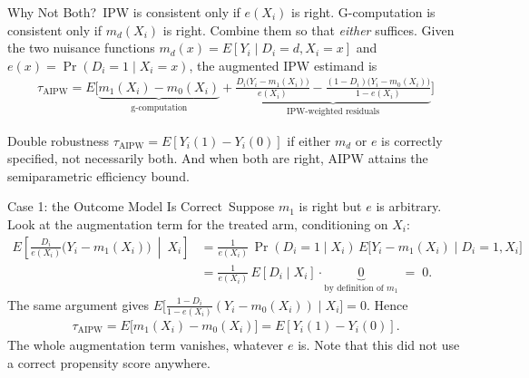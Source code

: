 \documentclass[aspectratio=169,11pt,xcolor=dvipsnames]{beamer}
\newcommand{\E}{E}
\newcommand{\adv}{\,\raisebox{0.6pt}{\textcolor{accent}{$\bigstar$}}}
\newcommand{\core}{\,\raisebox{0.6pt}{\textcolor{corestar}{$\bigstar$}}}
\begin{document}
\begin{frame}{Why Not Both?\core}
IPW is consistent only if $e(X_i)$ is right. G-computation is consistent only if
$m_d(X_i)$ is right. Combine them so that \emph{either} suffices.
\vskip3pt
Given the two nuisance functions
$m_d(x) = \E[Y_i\mid D_i=d,X_i=x]$ and $e(x) = \Pr(D_i=1\mid X_i=x)$, the
\alert{augmented IPW} estimand is
\begin{align*}
  \tau_{\text{AIPW}} = \E\Bigg[
  \underbrace{m_1(X_i) - m_0(X_i)}_{\text{g-computation}}
  + \underbrace{\frac{D_i\big(Y_i - m_1(X_i)\big)}{e(X_i)}
  - \frac{(1-D_i)\big(Y_i-m_0(X_i)\big)}{1-e(X_i)}}_{\text{IPW-weighted residuals}}
  \Bigg]
\end{align*}
\vskip3pt
\begin{block}{Double robustness}
$\tau_{\text{AIPW}} = \E[Y_i(1)-Y_i(0)]$ if \alert{either} $m_d$ \alert{or} $e$ is correctly
specified, not necessarily both. And when both are right, AIPW attains the
semiparametric efficiency bound.
\end{block}
\end{frame}

\begin{frame}{Case 1: the Outcome Model Is Correct\adv}
Suppose $m_1$ is right but $e$ is arbitrary. Look at the augmentation term for
the treated arm, conditioning on $X_i$:
\begin{align*}
  \E\!\left[\frac{D_i}{e(X_i)}\big(Y_i - m_1(X_i)\big)\ \middle|\ X_i\right]
  &= \frac{1}{e(X_i)}\,\Pr(D_i=1\mid X_i)\,
     \E\big[Y_i - m_1(X_i)\mid D_i=1,X_i\big] \\[2pt]
  &= \frac{1}{e(X_i)}\,\E[D_i \mid X_i]\cdot \underbrace{0}_{\text{by definition of } m_1}
   \;=\; 0 .
\end{align*}
\pause
The same argument gives
$\E\big[\tfrac{1-D_i}{1-e(X_i)}(Y_i - m_0(X_i)) \mid X_i\big] = 0$. Hence
\begin{align*}
  \tau_{\text{AIPW}} = \E\big[m_1(X_i) - m_0(X_i)\big] = \E[Y_i(1)-Y_i(0)] .
\end{align*}
\vskip2pt
\alert{The whole augmentation term vanishes}, whatever $e$ is. Note that this
did not use a correct propensity score anywhere.
\end{frame}
\end{document}
